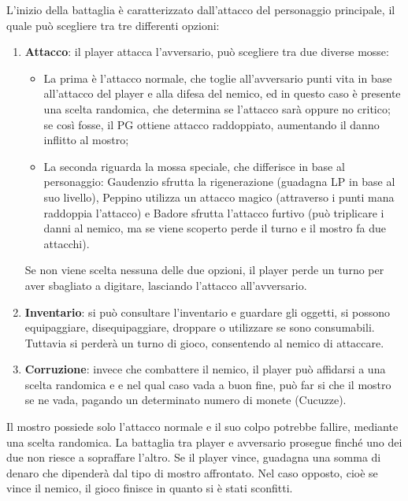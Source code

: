 \documentclass[10pt]{report}
\begin{document}
L'inizio della battaglia è caratterizzato dall'attacco del personaggio principale, il quale può scegliere tra tre differenti opzioni:
\begin{enumerate}

    \item \textbf{Attacco}: il player attacca l'avversario, può scegliere tra due diverse mosse:
 	\begin{itemize}

	     \item La prima è l'attacco normale, che toglie all'avversario punti vita in base all'attacco del player e
	     alla difesa del nemico, ed in questo caso è presente una scelta randomica, che determina se l'attacco sarà
	     oppure no critico; se così fosse, il PG ottiene attacco raddoppiato, aumentando il danno inflitto al
	     mostro;
	     \item La seconda riguarda la mossa speciale, che differisce in base al personaggio: Gaudenzio sfrutta la
	     rigenerazione (guadagna LP in base al suo livello), Peppino utilizza un attacco magico (attraverso i punti
	     mana raddoppia l'attacco) e Badore sfrutta l'attacco furtivo (può triplicare i danni al nemico, ma se viene
	     scoperto perde il turno e il mostro fa due attacchi).
	\end{itemize}
Se non viene scelta nessuna delle due opzioni, il player perde un turno per aver sbagliato a digitare, lasciando l'attacco all'avversario.

    \item \textbf{Inventario}: si può consultare l'inventario e guardare gli oggetti, si possono equipaggiare, disequipaggiare, droppare o utilizzare se sono consumabili. Tuttavia si perderà un turno di gioco, consentendo al nemico di attaccare.

    \item \textbf{Corruzione}: invece che combattere il nemico, il player può affidarsi a una scelta randomica e e nel qual caso vada a
    buon fine, può far si che il mostro se ne vada, pagando un determinato numero di monete (Cucuzze).
\end{enumerate}

Il mostro possiede solo l'attacco normale e il suo colpo potrebbe fallire, mediante una scelta randomica.
La battaglia tra player e avversario prosegue finché uno dei due non riesce a sopraffare
l'altro. Se il player vince, guadagna una somma di denaro che dipenderà dal tipo di mostro affrontato.
Nel caso opposto, cioè se vince il nemico, il gioco finisce in quanto si è stati sconfitti.
\end{document}
